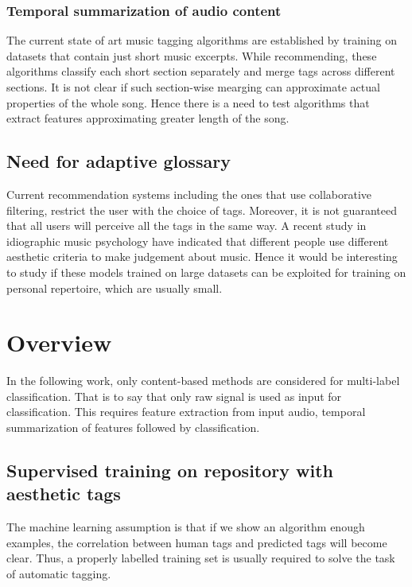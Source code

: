 \subsubsection{Temporal summarization of audio content}
The current state of art music tagging algorithms\cite{choi_crnn}\cite{MultiScale} are established by training on datasets that contain just short music excerpts. While recommending, these algorithms classify each short section separately and merge tags across different sections. It is not clear if such section-wise mearging can approximate actual properties of the whole song. Hence there is a need to test algorithms that extract features approximating greater length of the song. 

\subsection{Need for adaptive glossary}
Current recommendation systems including the ones that use collaborative filtering, restrict the user with the choice of tags. Moreover, it is not guaranteed that all users will perceive all the tags in the same way. A recent study in idiographic music psychology have indicated that different people use different aesthetic criteria to make judgement about music\cite{NoAccountingForTaste}. Hence it would be interesting to study if these models \cite{choi_cnn}\cite{choi_crnn} trained on large datasets can be exploited for training on personal repertoire, which are usually small.  


\section{Overview}
\label{overview}
In the following work, only content-based methods are considered for multi-label classification. That is to say that only raw signal is used as input for classification. This requires feature extraction from input audio, temporal summarization of features followed by classification. 

\subsection{Supervised training on repository with aesthetic tags }
The machine learning assumption is that if we show an algorithm enough examples, the correlation between human tags and predicted tags will become clear. Thus, a properly labelled training set is usually required to solve the task of automatic tagging. 

